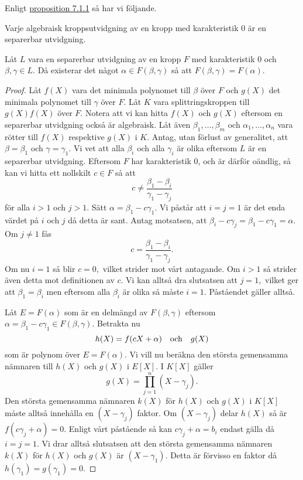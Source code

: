 \documentclass{article}
\theoremstyle{definition}
\begin{document}
Enligt \hyperlink{irrsep}{proposition 7.1.1} så har vi följande. 
\begin{myprop}{}{}
  Varje algebraisk kroppsutvidgning av en kropp med karakteristik 0 är en separerbar utvidgning. 
\end{myprop}

\begin{mylemma}{}{}
  Låt $L$ vara en separerbar utvidgning av en kropp $F$ med karakteristik 0 och $\beta, \gamma \in L$. Då existerar det 
  något $\alpha \in F(\beta, \gamma)$ så att $F(\beta, \gamma) = F(\alpha)$.
\end{mylemma}

\begin{proof}
  Låt $f(X)$ vara det minimala polynomet till $\beta$ över $F$ och $g(X)$ det minimala polynomet till $\gamma$ över $F$. Låt $K$ vara 
  splittringskroppen till $g(X)f(X)$ över $F$. Notera att vi kan hitta $f(X)$ och $g(X)$ eftersom en separerbar utvidgning också är algebraisk. 
  Låt även $\beta_1, \ldots, \beta_m$ och $\alpha_1, \ldots, \alpha_n$ vara rötter till $f(X)$ respektive $g(X)$ i $K$. Antag, 
  utan förlust av generalitet, att $\beta = \beta_1$ och $\gamma = \gamma_1.$ Vi vet att alla $\beta_i$ och alla $\gamma_i$ är olika 
  eftersom $L$ är en separerbar utvidgning. 
  Eftersom $F$ har karakteristik 0, och är därför oändlig, så kan vi 
  hitta ett nollskilt $c \in F$ så att 
  \[c \neq \frac{\beta_1 - \beta_i}{\gamma_1 - \gamma_j}\]
  för alla $i > 1$ och $j > 1.$ Sätt $\alpha = \beta_1 - c\gamma_1.$ Vi påstår att $i = j = 1$ är det enda värdet på $i$ och $j$ då detta är sant. 
  Antag motsatsen, att $\beta_i - c \gamma_j = \beta_1 - c\gamma_1 = \alpha.$ Om $j \neq 1$ fås
  \[ c = \frac{\beta_1 - \beta_i}{\gamma_1 - \gamma_j}. \]
  Om nu $i = 1$ så blir $c = 0,$ vilket strider mot vårt antagande. Om $i > 1$ så strider även detta mot definitionen av $c$. Vi kan alltså 
  dra slutsatsen att $j = 1,$ vilket ger att $\beta_1 = \beta_i$ men eftersom alla $\beta_i$ är olika så måste $i = 1.$ Påståendet gäller alltså.

  Låt $E = F(\alpha)$ som är en delmängd av $F(\beta, \gamma)$ eftersom $\alpha = \beta_1-c\gamma_1 \in F(\beta, \gamma).$
  Betrakta nu 
  \[h(X) = f(cX + \alpha) \quad \textnormal{och} \quad g(X)\]
  som är polynom över $E = F(\alpha)$. Vi vill nu beräkna den största gemensamma nämnaren till $h(X)$ och $g(X)$ i $E[X].$ I $K[X]$
  gäller
  \[ g(X) = \prod_{j = 1}^{n}(X-\gamma_j). \]
  Den största gemensamma nämnaren $k(X)$ för $h(X)$ och $g(X)$ i $K[X]$ måste alltså innehålla en $(X-\gamma_j)$ faktor. Om $(X - \gamma_j)$ delar 
  $h(X)$ så är $f(c\gamma_j + \alpha) = 0.$ Enligt vårt påstående så kan $c\gamma_j + \alpha = b_i$ endast gälla då $i = j = 1.$ Vi 
  drar alltså slutsatsen att den största gemensamma nämnaren $k(X)$ för $h(X)$ och $g(X)$ är $(X - \gamma_1)$. Detta är förvisso en faktor 
  då $h(\gamma_1) = g(\gamma_1) = 0.$ 


\end{proof}
\end{document}
